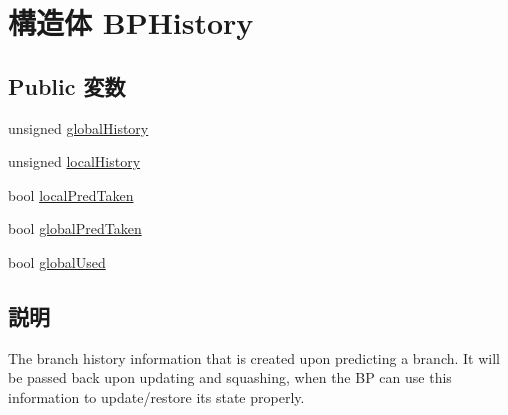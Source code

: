 \hypertarget{structTournamentBP_1_1BPHistory}{
\section{構造体 BPHistory}
\label{structTournamentBP_1_1BPHistory}
}
\subsection*{Public 変数}
\begin{DoxyCompactItemize}
\item 
unsigned \hyperlink{structTournamentBP_1_1BPHistory_a48805f17e95aa944cb6eda2fcf061adf}{globalHistory}
\item 
unsigned \hyperlink{structTournamentBP_1_1BPHistory_abd1ecd91e08530456ca48f9f9ee37ae1}{localHistory}
\item 
bool \hyperlink{structTournamentBP_1_1BPHistory_a3079bd6e296cf8dc0c0ddb8613b9143d}{localPredTaken}
\item 
bool \hyperlink{structTournamentBP_1_1BPHistory_a763776bd09694368843a75e358d9ad2f}{globalPredTaken}
\item 
bool \hyperlink{structTournamentBP_1_1BPHistory_a32f4254e16ae5ad5e8fe606127986427}{globalUsed}
\end{DoxyCompactItemize}


\subsection{説明}
The branch history information that is created upon predicting a branch. It will be passed back upon updating and squashing, when the BP can use this information to update/restore its state properly. 

